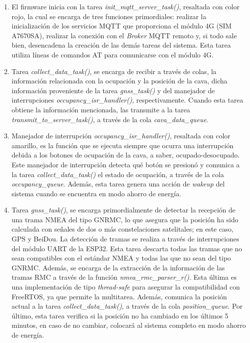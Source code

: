 \begin{enumerate}
	\item El firmware inicia con la tarea \textit{init\_mqtt\_server\_task()}, resaltada con color rojo, la cual se encarga de tres funciones primordiales: realizar la inicialización de los servicios MQTT que proporciona el módulo 4G (SIM A7670SA), realizar la conexión con el \textit{Broker} MQTT remoto y, si todo sale bien, desencadena la creación de las demás tareas del sistema. Esta tarea utiliza líneas de comandos AT para comunicarse con el módulo 4G.
	
	\item Tarea \textit{collect\_data\_task()}, se encarga de recibir a través de colas, la información relacionada con la ocupación y la posición de la cava, dicha información proveniente de la tarea \textit{gnss\_task()} y del manejador de interrupciones \textit{occupancy\_isr\_handler()}, respectivamente. Cuando esta tarea obtiene la información mencionada, las transmite a la tarea \textit{transmit\_to\_server\_task()}, a través de la cola \textit{cava\_data\_queue}.
	
	\item Manejador de interrupción \textit{occupancy\_isr\_handler()}, resaltada con color amarillo, es la función que se ejecuta siempre que ocurra una interrupción debida a los botones de ocupación de la cava, a saber, ocupado-desocupado. Este manejador de interrupción detecta qué botón se presionó y comunica a la tarea \textit{collect\_data\_task()} el estado de ocupación, a través de la cola \textit{occupancy\_queue}. Además, esta tarea genera una acción de \textit{wakeup} del sistema cuando se encuentra en modo ahorro de energía. 	
	
	\item Tarea \textit{gnss\_task()}, se encarga primordialmente de detectar la recepción de una trama NMEA del tipo GNRMC, lo que asegura que la posición ha sido calculada con señales de dos o más constelaciones satelitales; en este caso, GPS y BeiDou. La detección de tramas se realiza a través de interrupciones del módulo UART de la ESP32. Esta tarea descarta todas las tramas que no sean compatibles con el estándar NMEA y todas las que no sean del tipo GNRMC. Además, se encarga de la extracción de la información de las tramas RMC a través de la función \textit{nmea\_rmc\_parser\_r()}. Esta última es una implementación de tipo \textit{thread-safe} para asegurar la compatibilidad con FreeRTOS, ya que permite la multitarea. Además, comunica la posición actual a la tarea \textit{collect\_data\_task()}, a través de la cola \textit{position\_queue}. Por último, esta tarea verifica si la posición no ha cambiado en los últimos 5 minutos, en caso de no cambiar, colocará al sistema completo en modo ahorro de energía. 
		

\end{enumerate}
